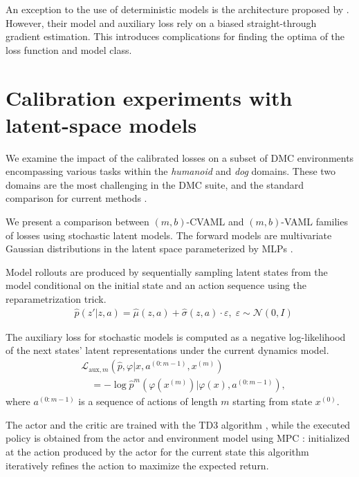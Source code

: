 An exception to the use of deterministic models is the architecture proposed by \textcite{antonoglou2022planning}.
However, their model and auxiliary loss rely on a biased straight-through gradient estimation.
This introduces complications for finding the optima of the loss function and model class.

\section{Calibration experiments with latent-space models}
\label{sec:empirical2}


We examine the impact of the calibrated losses on a subset of DMC environments \cite{tunyasuvunakool2020dmcontrol} encompassing various tasks within the \textit{humanoid} and \textit{dog} domains.
These two domains are the most challenging in the DMC suite, and the standard comparison for current methods \cite{voelcker2024mad,nauman2024bigger}.

We present a comparison between $(m,b)$-CVAML and $(m,b)$-VAML families of losses using stochastic latent models.
The forward models are multivariate Gaussian distributions in the latent space parameterized by MLPs \cite{pets,mbpo,paster2021blast}. 
 
Model rollouts are produced by sequentially sampling latent states from the model conditional on the initial state and an action sequence using the reparametrization trick. 
\begin{align}
&\hat{p}(\hat{z}'|z,a)=\hat{\mu}(z,a) + \hat{\sigma}(z,a)\cdot\varepsilon,\; \varepsilon \sim \mathcal{N}(0,I)
\end{align}

The auxiliary loss for stochastic models is computed as a negative log-likelihood of the next states' latent representations under the current dynamics model.
\begin{align}
    &\mathcal{L}_{\mathrm{aux},m}\left(\hat{p},\varphi\Big|x,a^{(0:m-1)},x^{(m)}\right) \nonumber\\
    &\quad =-\log \hat{p}^m\left(\varphi(x^{(m)})\Big|\varphi(x),a^{(0:m-1)}\right),
\end{align}
where $a^{(0:m-1)}$ is a sequence of actions of length $m$ starting from state $x^{(0)}$.

The actor and the critic are trained with the TD3 algorithm \cite{fujimoto2018addressing}, while the executed policy is obtained from the actor and environment model using MPC \cite{hansen2022temporal}: initialized at the action produced by the actor for the current state this algorithm iteratively refines the action to maximize the expected return.


